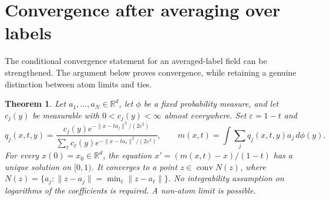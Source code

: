 \documentclass[11pt]{article}
\newtheorem{theorem}{Theorem}
\newcommand{\R}{\mathbb R}
\newcommand{\eps}{\varepsilon}
\begin{document}
\section{Convergence after averaging over labels}
The conditional convergence statement for an averaged-label field can be
strengthened. The argument below proves convergence, while retaining a genuine
distinction between atom limits and ties.
\begin{theorem}\label{thm:averaged}
Let $a_1,\ldots,a_N\in\R^d$, let $\phi$ be a fixed probability measure,
and let $c_j(y)$ be measurable with $0<c_j(y)<\infty$ almost everywhere.
Set $\eps=1-t$ and
\[
q_j(x,t,y)=\frac{c_j(y)e^{-\lVert x-ta_j\rVert^2/(2\eps^2)}}
 {\sum_\ell c_\ell(y)e^{-\lVert x-ta_\ell\rVert^2/(2\eps^2)}},\qquad
m(x,t)=\int\sum_jq_j(x,t,y)a_j\,d\phi(y).
\]
For every $x(0)=x_0\in\R^d$, the equation $x'=(m(x,t)-x)/(1-t)$ has a unique
solution on $[0,1)$. It converges to a point $z\in\operatorname{conv}N(z)$, where
$N(z)=\{a_j:\lVert z-a_j\rVert=\min_\ell\lVert z-a_\ell\rVert\}$.
No integrability assumption on logarithms of the coefficients
is required. A non-atom limit is possible.
\end{theorem}
\end{document}
